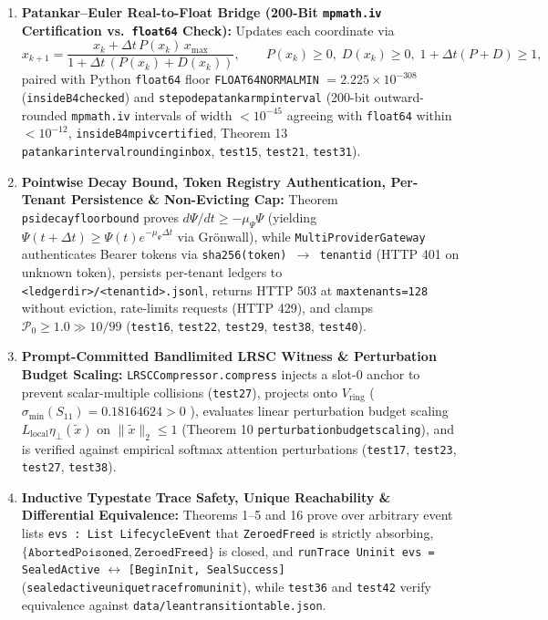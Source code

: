 \documentclass[10pt,letterpaper]{article}
\renewcommand{\_}{\textunderscore\allowbreak{}}
\begin{document}
\begin{enumerate}
  \item \textbf{Patankar--Euler Real-to-Float Bridge (200-Bit \texttt{mpmath.iv} Certification vs.\ \texttt{float64} Check):} Updates each coordinate via
  \begin{equation}
  x_{k+1} = \frac{x_k + \Delta t\,P(x_k)\,x_{\max}}{1 + \Delta t\,(P(x_k) + D(x_k))}, \qquad P(x_k) \ge 0,\; D(x_k) \ge 0,\; 1 + \Delta t(P+D) \ge 1,
  \end{equation}
  paired with Python \texttt{float64} floor \texttt{FLOAT64\_NORMAL\_MIN} $= 2.225 \times 10^{-308}$ (\texttt{inside\_B4\_checked}) and \texttt{step\_ode\_patankar\_mp\_interval} (200-bit outward-rounded \texttt{mpmath.iv} intervals of width $< 10^{-45}$ agreeing with \texttt{float64} within $< 10^{-12}$, \texttt{inside\_B4\_mp\_iv\_certified}, Theorem 13 \texttt{patankar\_interval\_rounding\_in\_box}, \texttt{test\_15}, \texttt{test\_21}, \texttt{test\_31}).
  \item \textbf{Pointwise Decay Bound, Token Registry Authentication, Per-Tenant Persistence \& Non-Evicting Cap:} Theorem \texttt{psi\_decay\_floor\_bound} proves $d\Psi/dt \ge -\mu_\Psi\Psi$ (yielding $\Psi(t+\Delta t) \ge \Psi(t)e^{-\mu_\Psi\Delta t}$ via Gr\"onwall), while \texttt{MultiProviderGateway} authenticates Bearer tokens via \texttt{sha256(token) $\to$ tenant\_id} (HTTP 401 on unknown token), persists per-tenant ledgers to \texttt{<ledger\_dir>/\allowbreak{}<tenant\_id>.jsonl}, returns HTTP 503 at \texttt{max\_tenants=128} without eviction, rate-limits requests (HTTP 429), and clamps $\mathcal{P}_0 \ge 1.0 \gg 10/99$ (\texttt{test\_16}, \texttt{test\_22}, \texttt{test\_29}, \texttt{test\_38}, \texttt{test\_40}).
  \item \textbf{Prompt-Committed Bandlimited LRSC Witness \& Perturbation Budget Scaling:} \texttt{LRSCCompressor.\allowbreak{}compress} injects a slot-0 anchor to prevent scalar-multiple collisions (\texttt{test\_27}), projects onto $V_{\text{ring}}$ ($\sigma_{\min}(S_{11}) = 0.18164624 > 0$ \cite{upadhyay2026lrsc}), evaluates linear perturbation budget scaling $L_{\text{local}}\eta_\perp(\tilde{x})$ on $\|\tilde{x}\|_2 \le 1$ \cite{kim2021lipschitz} (Theorem 10 \texttt{perturbation\_budget\_scaling}), and is verified against empirical softmax attention perturbations (\texttt{test\_17}, \texttt{test\_23}, \texttt{test\_27}, \texttt{test\_38}).
  \item \textbf{Inductive Typestate Trace Safety, Unique Reachability \& Differential Equivalence:} Theorems 1--5 and 16 prove over arbitrary event lists \texttt{evs : List LifecycleEvent} that \texttt{ZeroedFreed} is strictly absorbing, $\{\texttt{AbortedPoisoned}, \texttt{ZeroedFreed}\}$ is closed, and \texttt{runTrace Uninit evs = SealedActive} $\leftrightarrow$ \texttt{[BeginInit,\allowbreak{} SealSuccess]} (\texttt{sealed\_active\_unique\_trace\_from\_uninit}), while \texttt{test\_36} and \texttt{test\_42} verify equivalence against \texttt{data/lean\_transition\_table.json}.

\end{enumerate}
\end{document}
